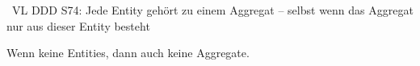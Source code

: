 



\missing\
VL DDD S74:
Jede Entity gehört zu einem Aggregat – selbst wenn das Aggregat nur aus dieser Entity besteht

Wenn keine Entities, dann auch keine Aggregate.